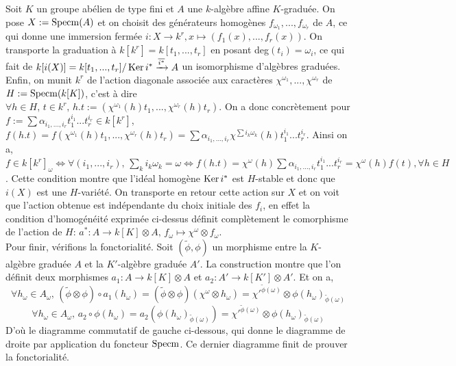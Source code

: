 \begin{cons}\label{consgraduequasitore}
Soit $K$ un groupe abélien de type fini et $A$ une $k$-algèbre affine $K$-graduée. On pose $X:=\operatorname{Specm}(A)$ et on choisit des générateurs homogènes $f_{\omega_1},...,f_{\omega_r}$ de $A$, ce qui donne une immersion fermée $i:X\rightarrow k^r, x\mapsto (f_1(x),...,f_r(x))$. On transporte la graduation à $k[k^r]=k[t_1,...,t_r]$ en posant deg$(t_i)=\omega _i$, ce qui fait de $k[i(X)]=k[t_1,...,t_r]/\operatorname{Ker} i^*\xrightarrow{\overline{i^*}}A$ un isomorphisme d'algèbres graduées. Enfin, on munit $k^r$ de l'action diagonale associée aux caractères $\chi^{\omega_1},...,\chi^{\omega_r}$ de $H:=\operatorname{Specm}(k[K])$, c'est à dire $\forall h\in H,\, t\in k^r,\, h.t := (\chi^{\omega_1}(h)t_1,...,\chi^{\omega_r}(h)t_r)$. On a donc concrètement pour $f:=\sum\alpha_{i_1,...,i_r}t_1^{i_1}...t_r^{i_r}\in k[k^r]$, $f(h.t)=f(\chi^{\omega_1}(h)t_1,...,\chi^{\omega_r}(h)t_r)=\sum\alpha_{i_1,...,i_r}\chi^{\sum i_k\omega_k}(h)t_1^{i_1}...t_r^{i_r}$. Ainsi on a, $f\in k[k^r]_{\omega}\iff \forall (i_1,...,i_r),\, \sum_k i_k\omega_k=\omega \iff f(h.t)=\chi^{\omega}(h)\sum\alpha_{i_1,...,i_r}t_1^{i_1}...t_r^{i_r}=\chi^{\omega}(h)f(t), \forall h\in H$. Cette condition montre que l'idéal homogène $\operatorname{Ker} i^*$ est $H$-stable et donc que $i(X)$ est une $H$-variété. On transporte en retour cette action sur $X$ et on voit que l'action obtenue est indépendante du choix initiale des $f_i$, en effet la condition d'homogénéité exprimée ci-dessus définit complètement le comorphisme de l'action de $H$: $a^*:A\rightarrow k[K]\otimes A,\, f_{\omega}\mapsto \chi^{\omega}\otimes f_{\omega}$.\\
Pour finir, vérifions la fonctorialité. Soit $(\widetilde{\phi},\phi)$ un morphisme entre la $K$-algèbre graduée $A$ et la $K'$-algèbre graduée $A'$. La construction montre que l'on définit deux morphismes $a_1:A\rightarrow k[K]\otimes A$ et $a_2:A'\rightarrow k[K']\otimes A'$. Et on a, $$\forall h_\omega \in A_\omega,\, (\widetilde{\phi}\otimes \phi)\circ a_1(h_\omega)=(\widetilde{\phi}\otimes \phi)(\chi^{\omega}\otimes h_\omega) = \chi'^{\widetilde{\phi}(\omega)}\otimes \phi(h_\omega)_{\widetilde{\phi}(\omega)}$$ 
$$\forall h_\omega \in A_\omega,\, a_2\circ \phi(h_\omega)=a_2(\phi(h_\omega)_{\widetilde{\phi}(\omega)})=\chi'^{\widetilde{\phi}(\omega)}\otimes \phi(h_\omega)_{\widetilde{\phi}(\omega)}$$
D'où le diagramme commutatif de gauche ci-dessous, qui donne le diagramme de droite par application du foncteur $\operatorname{Specm}$. Ce dernier diagramme finit de prouver la fonctorialité.
\begin{multicols}{2}
	\begin{center}
	\end{center}


\end{multicols}
\end{cons}
